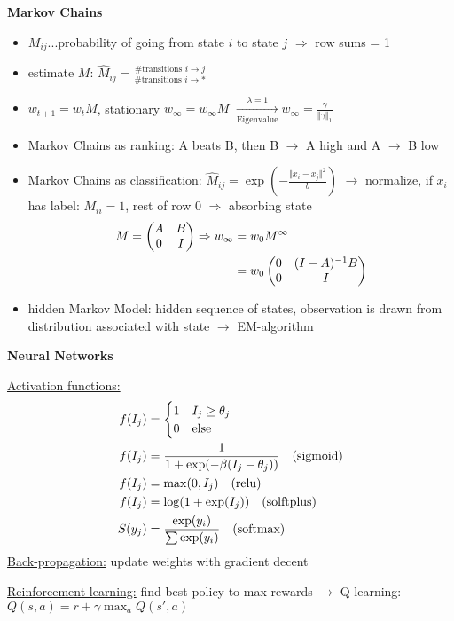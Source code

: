 \documentclass[10pt,landscape,a4paper]{article}
\begin{document}
\begin{multicols*}{4}
\begin{center}
	\normalsize{\textbf{Markov Chains}} \\
\end{center}
\begin{itemize}
	\item $M_{ij}$...probability of going from state $i$ to state $j$ $\Rightarrow$ row sums = 1
	\item estimate $M$: $\hat{M}_{ij} = \frac{\#\text{transitions } i\to j}{\#\text{transitions } i\to\ast}$
	\item $w_{t+1} = w_tM$, stationary $w_\infty = w_\infty M$ $\xrightarrow[\text{Eigenvalue}]{\lambda = 1} w_\infty = \frac{\gamma}{\Vert\gamma\Vert_1}$
	\item Markov Chains as ranking: A beats B, then B $\to$ A high and A $\to$ B low
	\item Markov Chains as classification: $\hat{M}_{ij} = \exp\left(-\frac{\Vert x_i-x_j\Vert^2}{b}\right)$ $\to$ normalize, if $x_i$ has label: $M_{ii} = 1$, rest of row 0 $\Rightarrow$ absorbing state
	\begin{align}
		M = \begin{pmatrix}
			A & B \\ 0 & I
		\end{pmatrix} \Rightarrow w_\infty &= w_0M^\infty \notag \\
		&= w_0\begin{pmatrix}
			0 & (I-A)^{-1}B \\ 0 & I
		\end{pmatrix} \notag
	\end{align}
	\item hidden Markov Model: hidden sequence of states, observation is drawn from distribution associated with state $\to$ EM-algorithm
\end{itemize}

\begin{center}
	\normalsize{\textbf{Neural Networks}} \\
\end{center}
\underline{Activation functions:}
\begin{align}
	f(I_j) &= \begin{cases}
		1 & I_j\ge\theta_j \\
		0 & \text{else}
	\end{cases} \notag \\
	f(I_j) &= \frac{1}{1+\exp(-\beta(I_j-\theta_j))} \quad\text{(sigmoid)} \notag \\
	f(I_j) &= \max(0,I_j) \quad\text{(relu)} \notag \\
	f(I_j) &= \log(1+\exp(I_j)) \quad\text{(solftplus)} \notag \\
	S(y_j) &= \frac{\exp(y_i)}{\sum\exp(y_i)} \quad\text{(softmax)} \notag
\end{align}
\underline{Back-propagation:} update weights with gradient decent

\underline{Reinforcement learning:} find best policy to max rewards $\to$ Q-learning: $Q(s,a) = r + \gamma\max_a Q(s',a)$

\end{multicols*}
\end{document}
